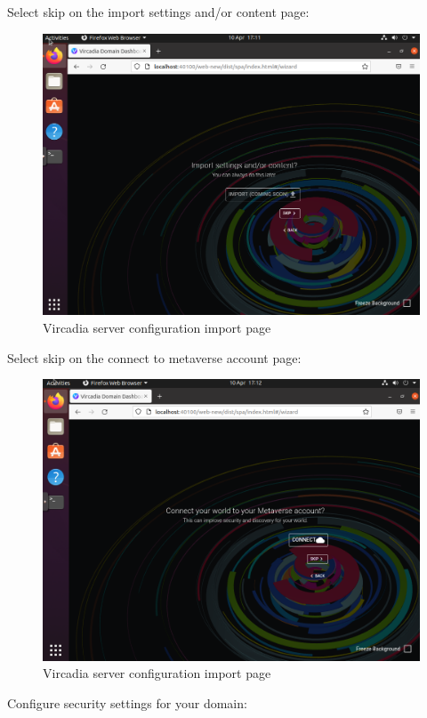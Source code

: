 Select skip on the import settings and/or content page:

\begin{figure}
\centering
\includegraphics{Vircadia2.png}
\caption{Vircadia server configuration import page}
\end{figure}

Select skip on the connect to metaverse account page:

\begin{figure}
\centering
\includegraphics{Vircadia3.png}
\caption{Vircadia server configuration import page}
\end{figure}

Configure security settings for your domain:

